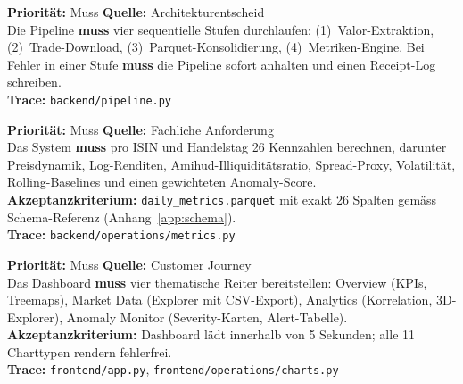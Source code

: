 \documentclass[12pt, a4paper, oneside]{report}
\newcommand{\code}[1]{\texttt{\small\textcolor{darknavy}{#1}}}
\begin{document}
\vspace{6pt}

\begin{reqbox}
\textbf{Priorit\"at:} Muss \quad \textbf{Quelle:} Architekturentscheid \\
Die Pipeline \textbf{muss} vier sequentielle Stufen durchlaufen: (1)~Valor-Extraktion, (2)~Trade-Download, (3)~Parquet-Konsolidierung, (4)~Metriken-Engine. Bei Fehler in einer Stufe \textbf{muss} die Pipeline sofort anhalten und einen Receipt-Log schreiben.\\[4pt]
\textbf{Trace:} \code{backend/pipeline.py}
\end{reqbox}

\vspace{6pt}

\begin{reqbox}
\textbf{Priorit\"at:} Muss \quad \textbf{Quelle:} Fachliche Anforderung \\
Das System \textbf{muss} pro ISIN und Handelstag 26 Kennzahlen berechnen, darunter Preisdynamik, Log-Renditen, Amihud-Illiquidit\"atsratio, Spread-Proxy, Volatilit\"at, Rolling-Baselines und einen gewichteten Anomaly-Score.\\[4pt]
\textbf{Akzeptanzkriterium:} \code{daily\_metrics.parquet} mit exakt 26 Spalten gem\"ass Schema-Referenz (Anhang~\ref{app:schema}).\\[4pt]
\textbf{Trace:} \code{backend/operations/metrics.py}
\end{reqbox}

\vspace{6pt}

\begin{reqbox}
\textbf{Priorit\"at:} Muss \quad \textbf{Quelle:} Customer Journey \\
Das Dashboard \textbf{muss} vier thematische Reiter bereitstellen: Overview (KPIs, Treemaps), Market Data (Explorer mit CSV-Export), Analytics (Korrelation, 3D-Explorer), Anomaly Monitor (Severity-Karten, Alert-Tabelle).\\[4pt]
\textbf{Akzeptanzkriterium:} Dashboard l\"adt innerhalb von 5 Sekunden; alle 11 Charttypen rendern fehlerfrei.\\[4pt]
\textbf{Trace:} \code{frontend/app.py}, \code{frontend/operations/charts.py}
\end{reqbox}

\vspace{6pt}
\end{document}
